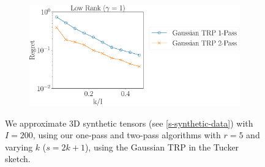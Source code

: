 \begin{figure}
\begin{subfigure}{0.55\textwidth}
		\includegraphics[scale = 0.25]{figure/fig3_lk_hnoise_200.pdf}
	\end{subfigure}
	\caption{We approximate 3D synthetic tensors (see \ref{s-synthetic-data}) with $I = 200$,
		using our one-pass and two-pass algorithms with $r = 5$ and varying $k$ ($s = 2k+1$),
		using the Gaussian TRP in the Tucker sketch.}\label{fig:vary-k-200-compare-app}

\end{figure}
